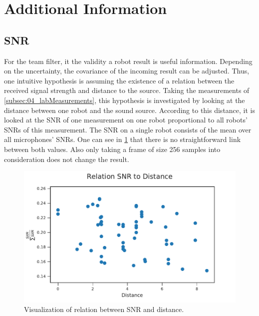 \section{Additional Information}
\label{sec:04_additionalInformation}



\subsection{SNR}
\label{subsec:04_snr}

For the team filter, it the validity a robot result is useful information.
Depending on the uncertainty, the covariance of the incoming result can be adjusted.
Thus, one intuitive hypothesis is assuming the existence of a relation between the
received signal strength and distance to the source.
Taking the measurements of \ref{subsec:04_labMeasurements}, this hypothesis is
investigated by looking at the distance between one robot and the sound source.
According to this distance, it is looked at the \ac{SNR} of one measurement on
one robot proportional to all robots' \acp{SNR} of this measurement.
The \ac{SNR} on a single robot consists of the mean over all microphones' \acp{SNR}.
One can see in \cref{fig:04_snrDistance} that there is no straightforward
link between both values.
Also only taking a frame of size 256 samples into consideration
does not change the result.
\begin{figure}[ht]
	\centering
	\includegraphics[]{figures/evaluation/snr_scatter}
	\caption{Visualization of relation between SNR and distance.}
	\label{fig:04_snrDistance}
\end{figure}

